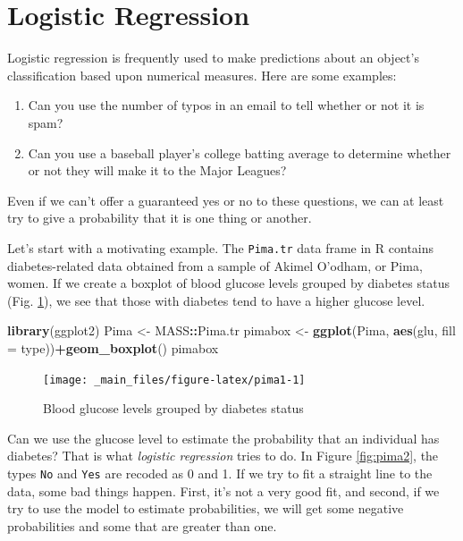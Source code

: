 \documentclass[
]{book}
\newenvironment{Shaded}{\begin{snugshade}}{\end{snugshade}}
\newcommand{\AttributeTok}[1]{\textcolor[rgb]{0.13,0.29,0.53}{#1}}
\newcommand{\FunctionTok}[1]{\textcolor[rgb]{0.13,0.29,0.53}{\textbf{#1}}}
\newcommand{\NormalTok}[1]{#1}
\newcommand{\OtherTok}[1]{\textcolor[rgb]{0.56,0.35,0.01}{#1}}
\newcommand{\SpecialCharTok}[1]{\textcolor[rgb]{0.81,0.36,0.00}{\textbf{#1}}}
\theoremstyle{definition}
\theoremstyle{definition}
\theoremstyle{definition}
\theoremstyle{definition}
\theoremstyle{remark}
\begin{document}
\section{Logistic Regression}\label{Logistic}

Logistic regression is frequently used to make predictions about an object's classification based upon numerical measures. Here are some examples:

\begin{enumerate}
\def\labelenumi{\arabic{enumi}.}
\item
  Can you use the number of typos in an email to tell whether or not it is spam?
\item
  Can you use a baseball player's college batting average to determine whether or not they will make it to the Major Leagues?
\end{enumerate}

Even if we can't offer a guaranteed yes or no to these questions, we can at least try to give a probability that it is one thing or another.

Let's start with a motivating example. The \texttt{Pima.tr} data frame in R contains diabetes-related data obtained from a sample of Akimel O'odham, or Pima, women. If we create a boxplot of blood glucose levels grouped by diabetes status (Fig. \ref{fig:pima1}), we see that those with diabetes tend to have a higher glucose level.

\begin{Shaded}
\begin{Highlighting}[]
\FunctionTok{library}\NormalTok{(ggplot2)}
\NormalTok{Pima }\OtherTok{\textless{}{-}}\NormalTok{ MASS}\SpecialCharTok{::}\NormalTok{Pima.tr}
\NormalTok{pimabox }\OtherTok{\textless{}{-}} \FunctionTok{ggplot}\NormalTok{(Pima, }\FunctionTok{aes}\NormalTok{(glu, }\AttributeTok{fill =}\NormalTok{ type))}\SpecialCharTok{+}\FunctionTok{geom\_boxplot}\NormalTok{()}
\NormalTok{pimabox}
\end{Highlighting}
\end{Shaded}

\begin{figure}

{\centering \texttt{[image: \_main\_files/figure-latex/pima1-1]} 

}

\caption{Blood glucose levels grouped by diabetes status}\label{fig:pima1}
\end{figure}

Can we use the glucose level to estimate the probability that an individual has diabetes? That is what \emph{logistic regression} tries to do. In Figure \ref{fig:pima2}, the types \texttt{No} and \texttt{Yes} are recoded as 0 and 1. If we try to fit a straight line to the data, some bad things happen. First, it's not a very good fit, and second, if we try to use the model to estimate probabilities, we will get some negative probabilities and some that are greater than one.
\end{document}
